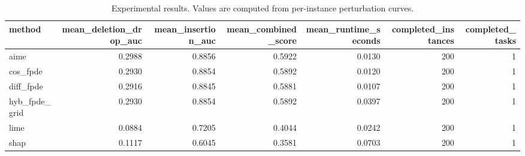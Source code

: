 \begin{table}[t]
\caption{Experimental results. Values are computed from per-instance perturbation curves.}
\label{tab:main_results_computed}
\centering
\begin{tabular}{lrrrrrr}
\toprule
method & mean\_deletion\_drop\_auc & mean\_insertion\_auc & mean\_combined\_score & mean\_runtime\_seconds & completed\_instances & completed\_tasks \\
\midrule
aime & 0.2988 & 0.8856 & 0.5922 & 0.0130 & 200 & 1 \\
cos\_fpde & 0.2930 & 0.8854 & 0.5892 & 0.0120 & 200 & 1 \\
diff\_fpde & 0.2916 & 0.8845 & 0.5881 & 0.0107 & 200 & 1 \\
hyb\_fpde\_grid & 0.2930 & 0.8854 & 0.5892 & 0.0397 & 200 & 1 \\
lime & 0.0884 & 0.7205 & 0.4044 & 0.0242 & 200 & 1 \\
shap & 0.1117 & 0.6045 & 0.3581 & 0.0703 & 200 & 1 \\
\bottomrule
\end{tabular}

\end{table}
